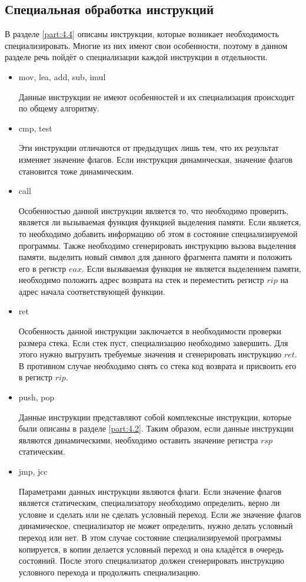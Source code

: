 \documentclass{spbau-diploma}
\begin{document}
\subsection{Специальная обработка инструкций}
\label{part:5.4}
В разделе \ref{part:4.4} описаны инструкции, которые возникает необходимость специализировать. Многие из них имеют свои особенности, поэтому в данном разделе речь пойдёт о специализации каждой инструкции в отдельности.
\begin{itemize}
\item{mov, lea, add, sub, imul}

Данные инструкции не имеют особенностей и их специализация происходит по общему алгоритму.
\item{cmp, test}

Эти инструкции отличаются от предыдущих лишь тем, что их результат изменяет значение флагов. Если инструкция динамическая, значение флагов становится тоже динамическим.
\item{call}

Особенностью данной инструкции является то, что необходимо проверить, является ли вызываемая функция функцией выделения памяти. Если является, то необходимо добавить информацию об этом в состояние специализируемой программы. Также необходимо сгенерировать инструкцию вызова выделения памяти, выделить новый символ для данного фрагмента памяти и положить его в регистр $eax$. Если вызываемая функция не является выделением памяти, необходимо положить адрес возврата на стек и переместить регистр $rip$ на адрес начала соответствующей функции.
\item{ret}

Особенность данной инструкции заключается в необходимости проверки размера стека. Если стек пуст, специализацию необходимо завершить. Для этого нужно выгрузить требуемые значения и сгенерировать инструкцию $ret$. В противном случае необходимо снять со стека код возврата и присвоить его в регистр $rip$.
\item{push, pop}

Данные инструкции представляют собой комплексные инструкции, которые были описаны в разделе \ref{part:4.2}. Таким образом, если данные инструкции являются динамическими, необходимо оставить значение регистра $rsp$ статическим.
\item{jmp, jcc}

Параметрами данных инструкции являются флаги. Если значение флагов является статическим, специализатору необходимо определить, верно ли условие и сделать или не сделать условный переход. Если же значение флагов динамическое, специализатор не может определить, нужно делать условный переход или нет. В этом случае состояние специализируемой программы копируется, в копии делается условный переход и она кладётся в очередь состояний. После этого специализатор должен сгенерировать инструкцию условного перехода и продолжить специализацию.
\end{itemize}
\end{document}
